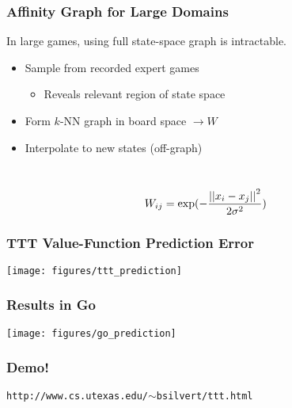 \begin{frame}
\frametitle{Affinity Graph for Large Domains}
In large games, using full state-space graph is intractable.
\begin{itemize}
  \item Sample from recorded expert games
    \begin{itemize}
    \item Reveals relevant region of state space
    \end{itemize}
  \item Form $k$-NN graph in board space $\rightarrow W$
  \item Interpolate to new states (off-graph)
\end{itemize} 
\ \\
\begin{equation*}
W_{ij} = \exp(-\frac{\left|\left|x_{i}-x_{j}\right|\right|^2}{2 \sigma^2})
\end{equation*}
\end{frame}

\begin{frame}
\frametitle{TTT Value-Function Prediction Error}
\texttt{[image: figures/ttt\_prediction]}
\end{frame}

\begin{frame}
\frametitle{Results in Go} 
\texttt{[image: figures/go\_prediction]}
\end{frame}

\begin{frame}
\frametitle{Demo!} 
\begin{center}
\texttt{http://www.cs.utexas.edu/$\sim$bsilvert/ttt.html}
\end{center}
\end{frame}

